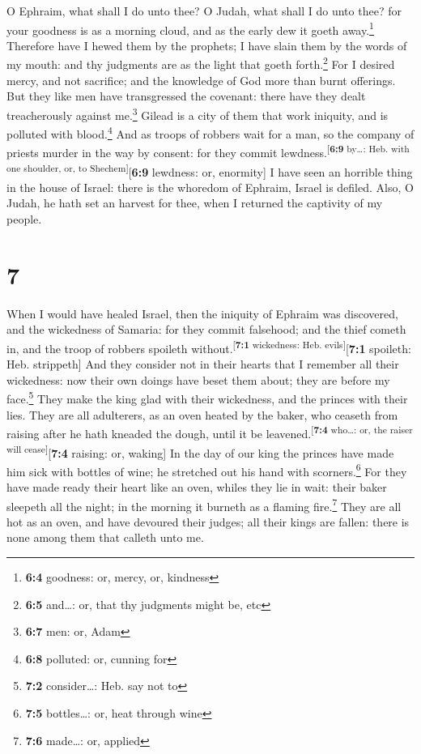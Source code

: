  O Ephraim, what shall I do unto thee? O Judah, what shall
I do unto thee? for your goodness is as a morning cloud, and as the
early dew it goeth away.\footnote{\textbf{6:4} goodness: or, mercy, or,
  kindness}  Therefore have I hewed them by the prophets;
I have slain them by the words of my mouth: and thy judgments are as the
light that goeth forth.\footnote{\textbf{6:5} and\ldots: or, that thy
  judgments might be, etc}  For I desired mercy, and not
sacrifice; and the knowledge of God more than burnt offerings.
 But they like men have transgressed the covenant: there
have they dealt treacherously against me.\footnote{\textbf{6:7} men: or,
  Adam}  Gilead is a city of them that work iniquity, and
is polluted with blood.\footnote{\textbf{6:8} polluted: or, cunning for}
 And as troops of robbers wait for a man, so the company
of priests murder in the way by consent: for they commit
lewdness.\textsuperscript{{[}\textbf{6:9} by\ldots: Heb. with one
shoulder, or, to Shechem{]}}{[}\textbf{6:9} lewdness: or, enormity{]}
 I have seen an horrible thing in the house of Israel:
there is the whoredom of Ephraim, Israel is defiled. 
Also, O Judah, he hath set an harvest for thee, when I returned the
captivity of my people.

\hypertarget{section-6}{%
\section{7}\label{section-6}}

 When I would have healed Israel, then the iniquity of
Ephraim was discovered, and the wickedness of Samaria: for they commit
falsehood; and the thief cometh in, and the troop of robbers spoileth
without.\textsuperscript{{[}\textbf{7:1} wickedness: Heb.
evils{]}}{[}\textbf{7:1} spoileth: Heb. strippeth{]}  And
they consider not in their hearts that I remember all their wickedness:
now their own doings have beset them about; they are before my
face.\footnote{\textbf{7:2} consider\ldots: Heb. say not to}
 They make the king glad with their wickedness, and the
princes with their lies.  They are all adulterers, as an
oven heated by the baker, who ceaseth from raising after he hath kneaded
the dough, until it be leavened.\textsuperscript{{[}\textbf{7:4}
who\ldots: or, the raiser will cease{]}}{[}\textbf{7:4} raising: or,
waking{]}  In the day of our king the princes have made
him sick with bottles of wine; he stretched out his hand with
scorners.\footnote{\textbf{7:5} bottles\ldots: or, heat through wine}
 For they have made ready their heart like an oven, whiles
they lie in wait: their baker sleepeth all the night; in the morning it
burneth as a flaming fire.\footnote{\textbf{7:6} made\ldots: or, applied}
 They are all hot as an oven, and have devoured their
judges; all their kings are fallen: there is none among them that
calleth unto me.

